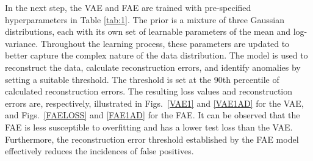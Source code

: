 \documentclass[journal]{IEEEtran}
\begin{document}
In the next step, the VAE and FAE are trained with pre-specified hyperparameters in Table \ref{tab:1}. The prior is a mixture of three Gaussian distributions, each with its own set of learnable parameters of the mean and log-variance. Throughout the learning process, these parameters are updated to better capture the complex nature of the data distribution. The model is used to reconstruct the data, calculate reconstruction errors, and identify anomalies by setting a suitable threshold. The threshold is set at the 90th percentile of calculated reconstruction errors. The resulting loss values and reconstruction errors are, respectively, illustrated in Figs.~\ref{VAE1} and \ref{VAE1AD} for the VAE, and Figs.~\ref{FAELOSS} and \ref{FAE1AD}  for the FAE. It can be observed that the FAE is less susceptible to overfitting and has a lower test loss than the VAE. Furthermore, the reconstruction error threshold established by the FAE model effectively reduces the incidences of false positives.
\end{document}
